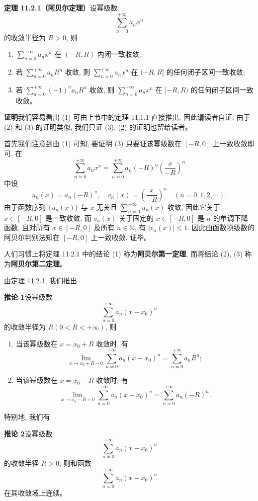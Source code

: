 \documentclass[UTF8, 12pt, fontset=fandol, oneside]{ctexart}
\begin{document}
\noindent\textbf{定理 11.2.1（阿贝尔定理）}\quad 设幂级数
\[
  \sum_{n=0}^{+\infty}a_nx^n
\]
的收敛半径为 $R>0$, 则
\begin{enumerate}
  \item $\sum_{n=0}^{+\infty}a_nx^n$ 在 $(-R,R)$ 内闭一致收敛;
  \item 若 $\sum_{n=0}^{+\infty}a_nR^n$ 收敛, 则 $\sum_{n=0}^{+\infty}a_nx^n$ 在 $(-R,R]$ 的任何闭子区间一致收敛;
  \item 若 $\sum_{n=0}^{+\infty}(-1)^na_nR^n$ 收敛, 则 $\sum_{n=0}^{+\infty}a_nx^n$ 在 $[-R,R)$ 的任何闭子区间一致收敛。
\end{enumerate}

\noindent\textbf{证明}\quad 我们容易看出 (1) 可由上节中的定理 11.1.1 直接推出, 因此请读者自证. 由于 (2) 和 (3) 的证明类似, 我们只证 (3), (2) 的证明也留给读者。

首先我们注意到由 (1) 可知, 要证明 (3) 只要证该幂级数在 $[-R,0]$ 上一致收敛即可. 在
\[
  \sum_{n=0}^{+\infty}a_nx^n
  =
  \sum_{n=0}^{+\infty}a_n(-R)^n\left(\frac{x}{-R}\right)^n
\]
中设
\[
  u_n(x)=a_n(-R)^n,\quad
  v_n(x)=\left(\frac{x}{-R}\right)^n
  \quad(n=0,1,2,\cdots).
\]
由于函数序列 $\{u_n(x)\}$ 与 $x$ 无关且 $\sum_{n=0}^{+\infty}u_n(x)$ 收敛, 因此它关于 $x\in[-R,0]$ 是一致收敛. 而 $v_n(x)$ 关于固定的 $x\in[-R,0]$ 是 $n$ 的单调下降函数, 且对所有 $x\in[-R,0]$ 及所有 $n\in\mathbb N$, 有 $|v_n(x)|\leqslant1$. 因此由函数项级数的阿贝尔判别法知在 $[-R,0]$ 上一致收敛. 证毕。

人们习惯上将定理 11.2.1 中的结论 (1) 称为\textbf{阿贝尔第一定理}, 而将结论 (2), (3) 称为\textbf{阿贝尔第二定理}。

由定理 11.2.1, 我们推出

\noindent\textbf{推论 1}\quad 设幂级数
\[
  \sum_{n=0}^{+\infty}a_n(x-x_0)^n
\]
的收敛半径为 $R(0<R<+\infty)$, 则
\begin{enumerate}
  \item 当该幂级数在 $x=x_0+R$ 收敛时, 有
  \[
    \lim_{x\to x_0+R-0}
    \sum_{n=0}^{+\infty}a_n(x-x_0)^n
    =
    \sum_{n=0}^{+\infty}a_nR^n;
  \]
  \item 当该幂级数在 $x=x_0-R$ 收敛时, 有
  \[
    \lim_{x\to x_0-R+0}
    \sum_{n=0}^{+\infty}a_n(x-x_0)^n
    =
    \sum_{n=0}^{+\infty}a_n(-R)^n.
  \]
\end{enumerate}
特别地, 我们有

\noindent\textbf{推论 2}\quad 设幂级数
\[
  \sum_{n=0}^{+\infty}a_n(x-x_0)^n
\]
的收敛半径 $R>0$, 则和函数
\[
  \sum_{n=0}^{+\infty}a_n(x-x_0)^n
\]
在其收敛域上连续。
\end{document}
